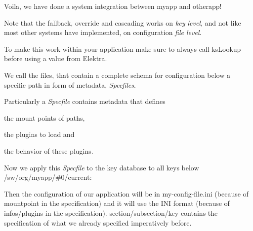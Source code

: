 Voila, we have done a system integration between {\ttfamily myapp} and {\ttfamily otherapp}!

Note that the fallback, override and cascading works on {\itshape key level}, and not like most other systems have implemented, on configuration {\itshape file level}.

To make this work within your application make sure to always call {\ttfamily ks\+Lookup} before using a value from Elektra.

We call the files, that contain a complete schema for configuration below a specific path in form of metadata, {\itshape Specfiles}.

Particularly a {\itshape Specfile} contains metadata that defines


\begin{DoxyItemize}
\item the mount points of paths,
\item the plugins to load and
\item the behavior of these plugins.
\end{DoxyItemize}




Now we apply this {\itshape Specfile} to the key database to all keys below {\ttfamily /sw/org/myapp/\#0/current}\+:




Then the configuration of our application will be in my-\/config-\/file.\+ini (because of {\ttfamily mountpoint} in the specification) and it will use the I\+NI format (because of {\ttfamily infos/plugins} in the specification). {\ttfamily section/subsection/key} contains the specification of what we already specified imperatively before.

